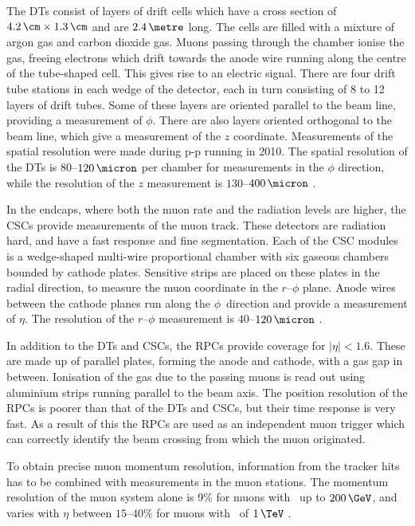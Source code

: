 The \acp{DT} consist of layers of drift cells which have a cross section of $4.2\,\cm \times 1.3\,\cm$ and
are $2.4\,\metre$ long. The cells are filled with a mixture of %
argon gas and carbon dioxide gas.
Muons passing through the chamber ionise the gas, freeing electrons
which drift towards the anode wire running along the centre of the tube-shaped cell. 
This gives rise to an electric signal. There are four drift tube stations in each wedge of 
the detector, each in turn consisting of 8 to 12 layers of drift tubes. Some of
these layers are oriented parallel to the beam line, providing a measurement of $\phi$.
There are also layers oriented orthogonal to the beam line, which give a measurement
of the $z$ coordinate. Measurements of the spatial resolution were made
during p-p running in 2010.
The spatial resolution of the \acp{DT} is $80$--$120\,\micron$ per chamber for
measurements in the $\phi$ direction, while the resolution of the $z$ measurement
is $130$--$400\,\micron$ \cite{cms-muon-7tev}. %

In the endcaps, where both the muon rate and the radiation levels are higher, the \acp{CSC} provide
measurements of the muon track. These detectors are radiation hard,
and have a fast response and fine segmentation.
Each of the \ac{CSC} modules is a wedge-shaped
multi-wire proportional chamber %
with six gaseous chambers bounded by cathode plates. Sensitive
strips are placed on these plates in the 
radial direction, to measure the muon coordinate in the  $r$--$\phi$ plane.
Anode wires between the cathode planes
run along the \mbox{$\phi$ direction} and provide a measurement of
$\eta$. The resolution of the $r$--$\phi$ measurement is $40$--$120\,\micron$ \cite{cms-muon-7tev}.

In addition to the \acp{DT} and \acp{CSC}, the \acp{RPC} provide coverage
for $|\eta|<1.6$. These are made up of parallel plates, forming the anode and cathode,
with a gas gap in between. Ionisation of the gas due to the passing
muons is read out using aluminium strips running parallel to the 
beam axis. The position resolution of the \acp{RPC} is poorer than
that of the \acp{DT} and \acp{CSC}, but their time response is very fast. As
a result of this the \acp{RPC} are used as an independent muon trigger
which can correctly identify the beam crossing from which the muon
originated.

To obtain precise muon momentum resolution, information from 
the tracker hits has to be combined with measurements in the
muon stations. The momentum resolution of the muon system
alone is 9\% for muons with \pT~up to $200\,\GeV$, and varies with $\eta$ 
between $15$--$40\%$ for muons with \pT~of $1\,\TeV$ \cite{cms-jinst}. %

